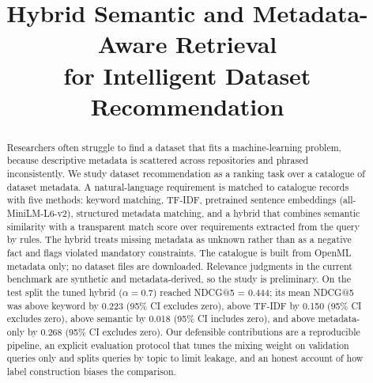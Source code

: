 \documentclass[conference]{IEEEtran}
\begin{document}
\title{Hybrid Semantic and Metadata-Aware Retrieval\\for Intelligent Dataset Recommendation}

\author{
}

\maketitle

\begin{abstract}
Researchers often struggle to find a dataset that fits a machine-learning problem, because descriptive metadata is scattered across repositories and phrased inconsistently. We study dataset recommendation as a ranking task over a catalogue of dataset metadata. A natural-language requirement is matched to catalogue records with five methods: keyword matching, TF-IDF, pretrained sentence embeddings (all-MiniLM-L6-v2), structured metadata matching, and a hybrid that combines semantic similarity with a transparent match score over requirements extracted from the query by rules. The hybrid treats missing metadata as unknown rather than as a negative fact and flags violated mandatory constraints. The catalogue is built from OpenML metadata only; no dataset files are downloaded. Relevance judgments in the current benchmark are synthetic and metadata-derived, so the study is preliminary. On the test split the tuned hybrid ($\alpha=0.7$) reached NDCG@5 = 0.444; its mean NDCG@5 was above keyword by 0.223 (95\% CI excludes zero), above TF-IDF by 0.150 (95\% CI excludes zero), above semantic by 0.018 (95\% CI includes zero), and above metadata-only by 0.268 (95\% CI excludes zero). Our defensible contributions are a reproducible pipeline, an explicit evaluation protocol that tunes the mixing weight on validation queries only and splits queries by topic to limit leakage, and an honest account of how label construction biases the comparison.
\end{abstract}
\end{document}
